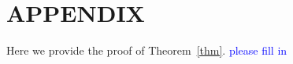 \documentclass[letterpaper, 10 pt, conference]{ieeeconf}  %
\begin{document}
\section*{APPENDIX}\label{appendix}
Here we provide the proof of Theorem~\ref{thm}. \textcolor{blue}{please fill in}

\addtolength{\textheight}{-2cm}   %


\end{document}
